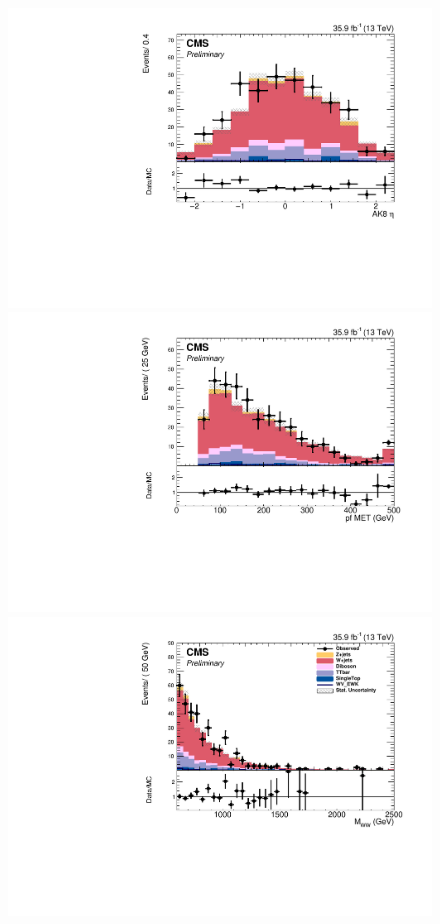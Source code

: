 \begin{figure}[htb]
\includegraphics[width=\cmsFigWidth]{Plots/plots/DibosonBoostedElMuCuts13TeV_WjetControlRegion_Tighter_CHS_ungroomed_PuppiAK8_jet_eta.pdf}
\includegraphics[width=\cmsFigWidth]{Plots/plots/DibosonBoostedElMuCuts13TeV_WjetControlRegion_Tighter_CHS_pfMET_Corr.pdf}
\includegraphics[width=\cmsFigWidth]{Plots/plots/DibosonBoostedElMuCuts13TeV_WjetControlRegion_Tighter_CHS_mass_lvj_type0_PuppiAK8.pdf}

\end{figure}
